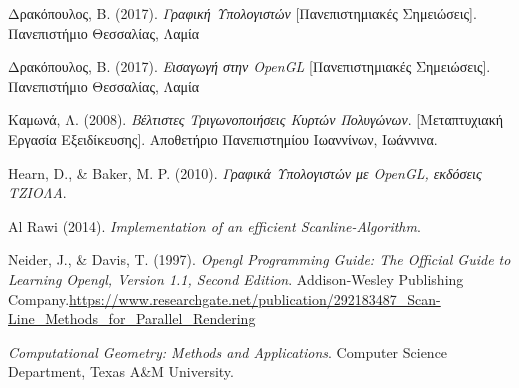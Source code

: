\begin{thebibliography}{7}

 Δρακόπουλος, Β. (2017). \emph{Γραφική Υπολογιστών} [Πανεπιστημιακές Σημειώσεις]. Πανεπιστήμιο Θεσσαλίας, Λαμία

 Δρακόπουλος, Β. (2017). \emph{Εισαγωγή στην \textlatin{OpenGL}} [Πανεπιστημιακές Σημειώσεις]. Πανεπιστήμιο Θεσσαλίας, Λαμία

 Καμωνά, Λ. (2008). \emph{Βέλτιστες Τριγωνοποιήσεις Κυρτών Πολυγώνων}. [Μεταπτυχιακή Εργασία Εξειδίκευσης]. Αποθετήριο Πανεπιστημίου Ιωαννίνων, Ιωάννινα.

 \textlatin{Hearn, D., \& Baker, M. P. (2010)}. \emph{Γραφικά Υπολογιστών με \textlatin{OpenGL}, εκδόσεις ΤΖΙΟΛΑ}.


 Al Rawi (2014). \emph{Implementation of an efficient Scanline-Algorithm}.

 Neider, J., \& Davis, T. (1997). \emph{Opengl Programming Guide: The Official Guide to Learning Opengl, Version 1.1, Second Edition}. Addison-Wesley Publishing Company.{\url{https://www.researchgate.net/publication/292183487_Scan-Line_Methods_for_Parallel_Rendering}}

 \emph{Computational Geometry: Methods and Applications}. Computer Science Department, Texas A\&M University.

\end{thebibliography}

